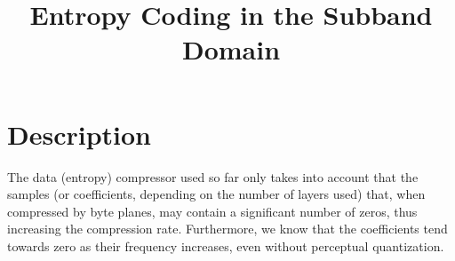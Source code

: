 

\title{Entropy Coding in the Subband Domain}







\maketitle

\section{Description}

The data (entropy) compressor used so far only takes into account that
the samples (or coefficients, depending on the number of layers used)
that, when compressed by byte planes, may contain a significant number
of zeros, thus increasing the compression rate. Furthermore, we know
that the coefficients tend towards zero as their frequency increases,
even without perceptual quantization.

